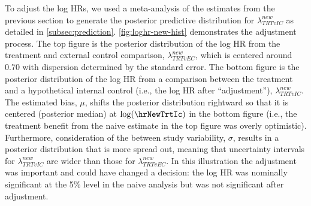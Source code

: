 \documentclass[11pt,final,fleqn]{article}\usepackage[]{graphicx}\usepackage[]{color}
\begin{document}
To adjust the log HRs, we used a meta-analysis of the estimates from the previous section to generate the posterior predictive distribution for $\lambda^{new}_{\textit{TRT}vIC}$ as detailed in \autoref{subsec:prediction}. \autoref{fig:loghr-new-hist} demonstrates the adjustment process.\cite{gabry2019visualization} The top figure is the posterior distribution of the log HR from the treatment and external control comparison, $\lambda^{new}_{\textit{TRT}vEC}$, which is centered around $0.70$ with dispersion determined by the standard error. The bottom figure is the posterior distribution of the log HR from a comparison between the treatment and a hypothetical internal control (i.e., the log HR after ``adjustment''), $\lambda^{new}_{\textit{TRT}vIC}$. The estimated bias, $\mu$, shifts the posterior distribution rightward so that it is centered (posterior median) at $\log(\hrNewTrtIc)$ in the bottom figure (i.e., the treatment benefit from the naive estimate in the top figure was overly optimistic). Furthermore, consideration of the between study variability, $\sigma$, results in a posterior distribution that is more spread out, meaning that uncertainty intervals for $\lambda^{new}_{\textit{TRT}vIC}$ are wider than those for $\lambda^{new}_{\textit{TRT}vEC}$. In this illustration the adjustment was important and could have changed a decision: the log HR was nominally significant at the 5\% level in the naive analysis but was not significant after adjustment.
\end{document}

